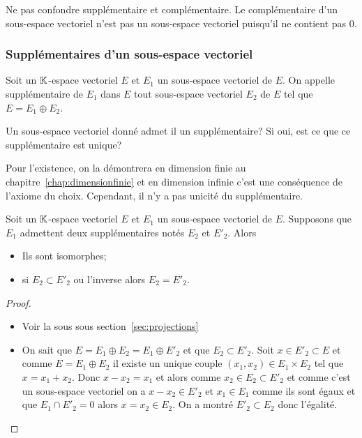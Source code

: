 Ne pas confondre supplémentaire et complémentaire. Le complémentaire d'un 
sous-espace vectoriel n'est pas un sous-espace vectoriel puisqu'il ne contient 
pas \(0\).

\subsubsection{Supplémentaires d'un sous-espace vectoriel}

\begin{defdef}
  Soit un \(\mathbb{K}\)-espace vectoriel \(E\) et \(E_1\) un sous-espace vectoriel de 
  \(E\). On appelle supplémentaire de \(E_1\) dans \(E\) tout sous-espace 
  vectoriel \(E_2\) de \(E\) tel que \(E= E_1 \oplus E_2\).
\end{defdef}

Un sous-espace vectoriel donné admet il un supplémentaire? Si oui, est ce que ce 
supplémentaire est unique?

Pour l'existence, on la démontrera en dimension finie au chapitre~\ref{chap:dimensionfinie}
et en dimension infinie c'est une conséquence de l'axiome du choix. 
Cependant, il n'y a pas unicité du supplémentaire.

\begin{prop}\label{prop:deuxsuppiso}
  Soit un \(\mathbb{K}\)-espace vectoriel \(E\) et \(E_1\) un sous-espace vectoriel de 
  \(E\). Supposons que \(E_1\) admettent deux supplémentaires notés \(E_2\) et 
  \(E'_2\). Alors
  \begin{itemize}
    \item Ils sont isomorphes;
    \item si \(E_2 \subset E'_2\) ou l'inverse alors \(E_2=E'_2\).
  \end{itemize}
\end{prop}
\begin{proof}
  \begin{itemize}
    \item Voir la sous sous section~\ref{sec:projections}
    \item On sait que \(E=E_1 \oplus E_2=E_1 \oplus E'_2\) et que \(E_2 \subset 
      E'_2\). Soit \(x \in E'_2 \subset E\) et comme \(E=E_1 \oplus E_2\) il 
      existe un unique couple \((x_1,x_2 ) \in E_1 \times E_2\) tel que 
      \(x=x_1+x_2\). Donc \(x-x_2=x_1\) et alors comme \(x_2 \in E_2 \subset 
      E'_2\) et comme c'est un sous-espace vectoriel on a \(x-x_2\in E'_2\)  et 
      \(x_1 \in E_1\) comme ils sont égaux et que \(E_1 \cap E'_2=0\)  alors 
      \(x=x_2 \in E_2\). On a montré \(E'_2 \subset E_2\) donc l'égalité.
  \end{itemize}
\end{proof}

